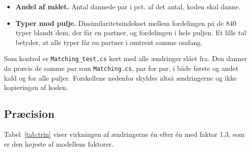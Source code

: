 \documentclass[11pt,a4paper]{article}
\newcommand{\kode}[1]{\texttt{#1}}
\begin{document}
\begin{itemize}
\item \textbf{Andel af målet.} Antal dannede par i pct. af det antal, koden skal danne.
\item \textbf{Typer mod pulje.} Dissimilaritetsindekset mellem fordelingen på de 840 typer blandt
dem, der får en partner, og fordelingen i hele puljen. Et lille tal betyder, at alle typer får en
partner i omtrent samme omfang.
\end{itemize}

Som kontrol er \kode{Matching\_test.cs} kørt med alle ændringer slået fra. Den danner da præcis de
samme par som \kode{Matching.cs}, par for par, i både første og andet kald og for alle puljer.
Forskellene nedenfor skyldes altså ændringerne og ikke kopieringen af koden.

\subsection{Præcision}\label{sec:nymetode-praecision}

Tabel~\ref{tab:trin} viser virkningen af ændringerne én efter én med faktor 1,3, som er den højeste
af modellens faktorer.
\end{document}
